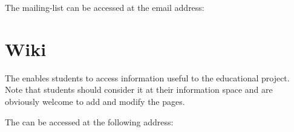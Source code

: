 The mailing-list can be accessed at the email address:

\begin{center}
\end{center}

%
%

\section{Wiki}

The  enables students to access information useful to the
 educational project. Note that students should consider it
at their information space and are obviously welcome to add and modify the
pages.

The   can be accessed at the following address:

\begin{center}
\end{center}
